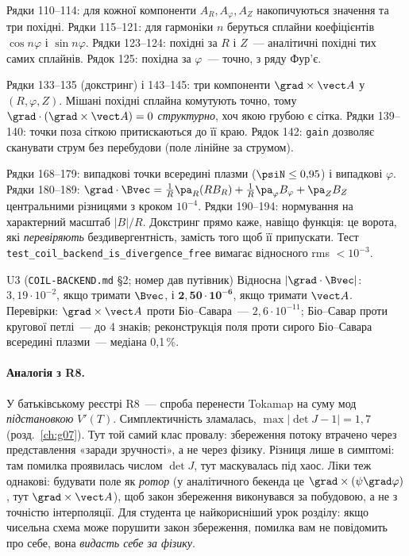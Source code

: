 
Рядки 110--114: для кожної компоненти $A_R,A_\varphi,A_Z$ накопичуються значення та три
похідні. Рядки 115--121: для гармоніки $n$ беруться сплайни коефіцієнтів $\cos n\varphi$ і
$\sin n\varphi$. Рядки 123--124: похідні за $R$ і $Z$~--- аналітичні похідні тих самих сплайнів.
Рядок 125: похідна за $\varphi$~--- точно, з ряду Фур'є.


Рядки 133--135 (докстринг) і 143--145: три компоненти $\grad\times\vect A$ у $(R,\varphi,Z)$.
Мішані похідні сплайна комутують точно, тому $\grad\cdot(\grad\times\vect A)=0$ \emph{структурно},
хоч якою грубою є сітка. Рядки 139--140: точки поза сіткою притискаються до її краю. Рядок 142:
\texttt{gain} дозволяє сканувати струм без перебудови (поле лінійне за струмом).


Рядки 168--179: випадкові точки всередині плазми ($\psiN\le0{,}95$) і випадкові $\varphi$.
Рядки 180--189: $\grad\cdot\Bvec=\frac1R\pa_R(RB_R)+\frac1R\pa_\varphi B_\varphi+\pa_ZB_Z$
центральними різницями з кроком $10^{-4}$. Рядки 190--194: нормування на характерний масштаб
$|B|/R$. Докстринг прямо каже, навіщо функція: це ворота, які \emph{перевіряють} бездивергентність,
замість того щоб її припускати. Тест \nolinkurl{test_coil_backend_is_divergence_free} вимагає
відносного rms $<10^{-3}$.

\begin{established}{U3 (\texttt{COIL-BACKEND.md} §2; номер дав путівник)}
Відносна $|\grad\cdot\Bvec|$: $3{,}19\cdot10^{-2}$, якщо тримати $\Bvec$, і
$\mathbf{2{,}50\cdot10^{-6}}$, якщо тримати $\vect A$. Перевірки: $\grad\times\vect A$ проти
Біо--Савара~--- $2{,}6\cdot10^{-11}$; Біо--Савар проти кругової петлі~--- до 4 знаків;
реконструкція поля проти сирого Біо--Савара всередині плазми~--- медіана 0,1\,\%.
\end{established}

\paragraph{Аналогія з R8.} У батьківському реєстрі R8~--- спроба перенести Tokamap на суму мод
\emph{підстановкою} $V'(T)$. Симплектичність зламалась, $\max|\det J-1|=1{,}7$
(розд.~\ref{ch:g07}). Тут той самий клас провалу: збереження потоку втрачено через представлення
«заради зручності», а не через фізику. Різниця лише в симптомі: там помилка проявилась числом
$\det J$, тут маскувалась під хаос. Ліки теж однакові: будувати поле як \emph{ротор} (у
аналітичного бекенда це $\grad\times(\psi\grad\varphi)$, тут $\grad\times\vect A$), щоб закон
збереження виконувався за побудовою, а не з точністю інтерполяції. Для студента це найкорисніший
урок розділу: якщо чисельна схема може порушити закон збереження, помилка вам не повідомить про
себе, вона \emph{видасть себе за фізику}.

